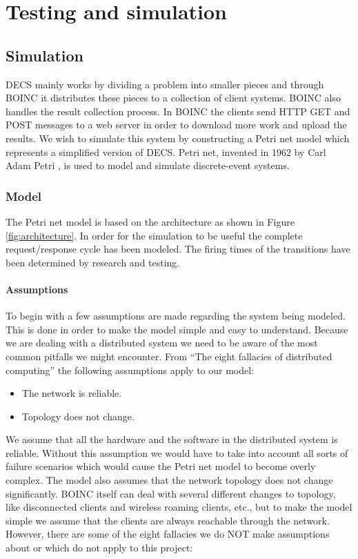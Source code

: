 
\chapter{Testing and simulation}
\label{testing}


\section{Simulation}

DECS mainly works by dividing a problem into smaller pieces and through BOINC \cite{boinc} it distributes these pieces to a collection of client systems.
BOINC also handles the result collection process.
In BOINC the clients send HTTP GET and POST messages to a web server in order to download more work and upload the results.
We wish to simulate this system by constructing a Petri net model which represents a simplified version of DECS.
Petri net, invented in 1962 by Carl Adam Petri \cite{Petri62, Petri66}, is used to model and simulate discrete-event systems.


\subsection{Model}

The Petri net model is based on the architecture as shown in Figure \ref{fig:architecture}.
In order for the simulation to be useful the complete request/response cycle has been modeled.
The firing times of the transitions have been determined by research and testing.


\subsubsection{Assumptions}

To begin with a few assumptions are made regarding the system being modeled.
This is done in order to make the model simple and easy to understand.
Because we are dealing with a distributed system we need to be aware of the most common pitfalls we might encounter.
From ``The eight fallacies of distributed computing'' \cite{distributed-fallacies} the following assumptions apply to our model:

\begin{itemize}
	\item The network is reliable.
	\item Topology does not change.
\end{itemize}
We assume that all the hardware and the software in the distributed system is reliable.
Without this assumption we would have to take into account all sorts of failure scenarios which would cause the Petri net model to become overly complex.
The model also assumes that the network topology does not change significantly.
BOINC itself can deal with several different changes to topology, like disconnected clients and wireless roaming clients, etc., but to make the model simple we assume that the clients are always reachable through the network.
However, there are some of the eight fallacies we do NOT make assumptions about or which do not apply to this project:

